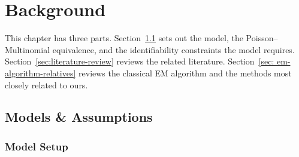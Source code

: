 \chapter{Background}
\label{cha:model-specification}

This chapter has three parts. Section~\ref{sec:model-setup-assumption} sets out the model, the Poisson--Multinomial equivalence, and the identifiability constraints the model requires. Section~\ref{sec:literature-review} reviews the related literature. Section~\ref{sec: em-algorithm-relatives} reviews the classical EM algorithm and the methods most closely related to ours.

\section{Models \& Assumptions}
\label{sec:model-setup-assumption}

\subsection{Model Setup}
\label{subsec:model-setup}

